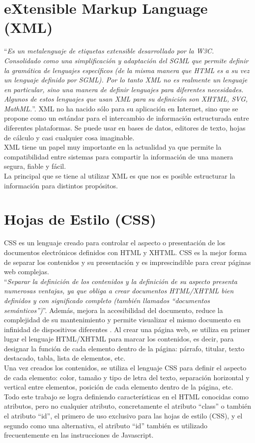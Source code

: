 \section{eXtensible Markup Language (XML)}
``\textit{Es un metalenguaje de etiquetas extensible desarrollado por la W3C. Consolidado como una simplificaci\'on y adaptaci\'on del SGML que permite definir la gram\'atica de lenguajes espec\'ificos (de la misma manera que HTML es a su vez un lenguaje definido por SGML). Por lo tanto XML no es realmente un lenguaje en particular, sino una manera de definir lenguajes para diferentes necesidades. Algunos de estos lenguajes que usan XML para su definici\'on son XHTML, SVG, MathML.}''. \cite{xml}
XML no ha nacido s\'olo para su aplicaci\'on en Internet, sino que se propone como un est\'andar para el intercambio de informaci\'on estructurada entre diferentes plataformas. Se puede usar en bases de datos, editores de texto, hojas de c\'alculo y casi cualquier cosa imaginable.\\
XML tiene un papel muy importante en la actualidad ya que permite la compatibilidad entre sistemas para compartir la informaci\'on de una manera segura, fiable y f\'acil.\\
La principal que se tiene al utilizar XML es que nos es posible estructurar la informaci\'on para distintos prop\'ositos.

\section{Hojas de Estilo (CSS)}
CSS es un lenguaje creado para controlar el aspecto o presentaci\'on de los documentos electr\'onicos definidos con HTML y XHTML. CSS es la mejor forma de separar los contenidos y su presentaci\'on y es imprescindible para crear p\'aginas web complejas.\\
``\textit{Separar la definici\'on de los contenidos y la definici\'on de su aspecto presenta numerosas ventajas, ya que obliga a crear documentos HTML/XHTML bien definidos y con significado completo (tambi\'en llamados ``documentos sem\'anticos'')}''. Adem\'as, mejora la accesibilidad del documento, reduce la complejidad de su mantenimiento y permite visualizar el mismo documento en infinidad de dispositivos diferentes \cite{css}.
Al crear una p\'agina web, se utiliza en primer lugar el lenguaje HTML/XHTML para marcar  los contenidos, es decir, para designar la funci\'on de cada elemento dentro de la p\'agina: p\'arrafo, titular, texto destacado, tabla, lista de elementos, etc.\\
Una vez creados los contenidos, se utiliza el lenguaje CSS para definir el aspecto de cada elemento: color, tama\~no y tipo de letra del texto, separaci\'on horizontal y vertical entre elementos,  posici\'on de cada elemento dentro de la p\'agina, etc.\\
Todo este trabajo se logra definiendo caracter\'isticas en el HTML conocidas como atributos, pero no cualquier atributo, concretamente el atributo ``class'' o tambi\'en el atributo ``id'', el primero de uso exclusivo para las hojas de estilo (CSS), y el segundo como una alternativa, el atributo ``id'' tambi\'en es utilizado frecuentemente en las instrucciones de Javascript.

